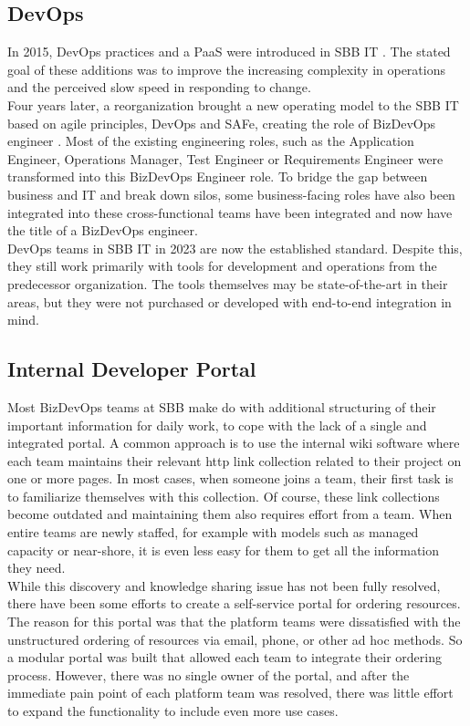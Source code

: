 \documentclass[a4paper,12pt]{article}
\begin{document}
    \subsection{DevOps}
    \label{subsec:sbbdevops}
    In 2015, DevOps practices and a PaaS were introduced in SBB IT .
    The stated goal of these additions was to improve the increasing complexity in operations and the perceived slow
    speed in responding to change\parencite{sbbdevops}.\\
    Four years later, a reorganization brought a new operating model to the SBB IT based on agile principles, DevOps and
    SAFe, creating the role of BizDevOps engineer\parencite{sbbagile} .
    Most of the existing engineering roles, such as the Application Engineer, Operations Manager, Test Engineer or
    Requirements Engineer were transformed into this BizDevOps Engineer role.
    To bridge the gap between business and IT and break down silos, some business-facing roles have also been integrated into these
    cross-functional teams have been integrated and now have the title of a BizDevOps engineer.\\
    DevOps teams in SBB IT in 2023 are now the established standard.
    Despite this, they still work primarily with tools for development and operations from the predecessor organization.
    The tools themselves may be state-of-the-art in their areas, but they were not purchased or developed with
    end-to-end integration in mind.

    \subsection{Internal Developer Portal}
    \label{subsec:sbbportal}
    Most BizDevOps teams at SBB make do with additional structuring of their important information for daily work, to cope
    with the lack of a single and integrated portal.
    A common approach is to use the internal wiki software where each team maintains their relevant http link collection
    related to their project on one or more pages.
    In most cases, when someone joins a team, their first task is to familiarize themselves with this collection.
    Of course, these link collections become outdated and maintaining them also requires effort from a team.
    When entire teams are newly staffed, for example with models such as managed capacity or near-shore, it is even less
    easy for them to get all the information they need.\\
    While this discovery and knowledge sharing issue has not been fully resolved, there have been some efforts to create
    a self-service portal for ordering resources.
    The reason for this portal was that the platform teams were dissatisfied with the unstructured ordering of resources
    via email, phone, or other ad hoc methods.
    So a modular portal was built that allowed each team to integrate their ordering process.
    However, there was no single owner of the portal, and after the immediate pain point of each platform team was
    resolved, there was little effort to expand the functionality to include even more use cases.
\end{document}
